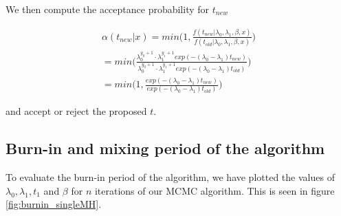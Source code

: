 %



We then compute the acceptance probability for $t_{new}$

\begin{align}
    \alpha(t_{new}|x) = min \Big( 1, \frac{f(t_{new}| \lambda_0, \lambda_1, \beta, x)}{f(t_{old}| \lambda_0, \lambda_1, \beta, x)} \Big) \nonumber \\ 
    = min \Big( \frac{\lambda_0^{y_0 + 1} \cdot \lambda_1^{y_1 + 1} exp(-(\lambda_0 - \lambda_1)t_{new})}{\lambda_0^{y_0 + 1} \cdot \lambda_1^{y_1 + 1} exp(-(\lambda_0 - \lambda_1)t_{old})} \Big) \nonumber \\
    = min \Big( 1, \frac{exp(-(\lambda_0 - \lambda_1)t_{new})}{exp(-(\lambda_0 - \lambda_1)t_{old})} \Big)
\end{align}



and accept or reject the proposed $t$. 



\subsection{Burn-in and mixing period of the algorithm}

To evaluate the burn-in period of the algorithm, we have plotted the values of $\lambda_0, \lambda_1, t_1$ and $\beta$ for $n$ iterations of our MCMC algorithm. This is seen in figure \ref{fig:burnin_singleMH}. 


